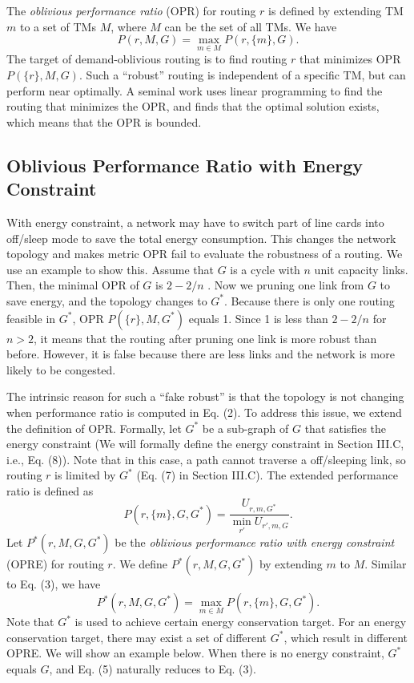 \documentclass[conference]{IEEEtran}
\begin{document}
The \emph{oblivious performance ratio} (OPR) for routing $r$ is defined by extending TM $m$ to a set of TMs $M$, where $M$ can be the set of all TMs. We have
\begin{equation}
	P(r, M, G) = \max_{m\in M} P(r, \{ m \}, G).
\end{equation}
The target of demand-oblivious routing is to find routing $r$ that minimizes OPR $P(\{ r \}, M, G)$. Such a ``robust'' routing is independent of a specific TM, but can perform near optimally. A seminal work \cite{networking:oblivious} uses linear programming to find the routing that minimizes the OPR, and finds that the optimal solution exists, which means that the OPR is bounded.

\subsection{Oblivious Performance Ratio with Energy Constraint}

With energy constraint, a network may have to switch part of line cards into off/sleep mode to save the total energy consumption. This changes the network topology and makes metric OPR fail to evaluate the robustness of a routing. We use an example to show this. Assume that $G$ is a cycle with $n$ unit capacity links. Then, the minimal OPR of $G$ is $2-2/n$ \cite{networking:oblivious}. Now we pruning one link from $G$ to save energy, and the topology changes to $G^*$. Because there is only one routing feasible in $G^*$, OPR $P(\{ r \}, M, G^*)$ equals 1. Since 1 is less than $2-2/n$ for $n > 2$, it means that the routing after pruning one link is more robust than before. However, it is false because there are less links and the network is more likely to be congested.

The intrinsic reason for such a ``fake robust'' is that the topology is not changing when performance ratio is computed in Eq. (2). To address this issue, we extend the definition of OPR. Formally, let $G^*$ be a sub-graph of $G$ that satisfies the energy constraint (We will formally define the energy constraint in Section III.C, i.e., Eq. (8)). Note that in this case, a path cannot traverse a off/sleeping link, so routing $r$ is limited by $G^*$ (Eq. (7) in Section III.C). The extended performance ratio is defined as
\begin{equation}
	P(r, \{ m \}, G, G^*) = \frac{U_{r,m,G^*}}{\min_{r'} U_{r', m, G}}.
\end{equation}
Let $P^*(r, M, G, G^*)$ be the \emph{oblivious performance ratio with energy constraint} (OPRE) for routing $r$. We define $P^*(r, M, G, G^*)$ by extending $m$ to $M$. Similar to Eq. (3), we have
\begin{equation}
	P^*(r, M, G, G^*) = \max_{m\in M} P(r, \{ m \}, G, G^*).
\end{equation}
Note that $G^*$ is used to achieve certain energy conservation target. For an energy conservation target, there may exist a set of different $G^*$, which result in different OPRE. We will show an example below. When there is no energy constraint, $G^*$ equals $G$, and Eq. (5) naturally reduces to Eq. (3).
\end{document}
